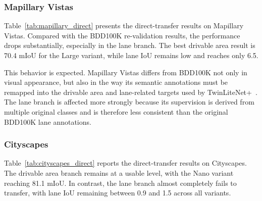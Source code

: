 \documentclass[conference]{IEEEtran}
\begin{document}
\subsubsection{Mapillary Vistas}
Table~\ref{tab:mapillary_direct} presents the direct-transfer results on Mapillary Vistas. Compared with the BDD100K re-validation results, the performance drops substantially, especially in the lane branch. The best drivable area result is 70.4 mIoU for the Large variant, while lane IoU remains low and reaches only 6.5.

\begin{table}[!t]
\centering
\caption{Direct transfer results on Mapillary Vistas.}
\label{tab:mapillary_direct}
\end{table}

This behavior is expected. Mapillary Vistas differs from BDD100K not only in visual appearance, but also in the way its semantic annotations must be remapped into the drivable area and lane-related targets used by TwinLiteNet+~\cite{ref2,ref4}. The lane branch is affected more strongly because its supervision is derived from multiple original classes and is therefore less consistent than the original BDD100K lane annotations.

\subsubsection{Cityscapes}
Table~\ref{tab:cityscapes_direct} reports the direct-transfer results on Cityscapes. The drivable area branch remains at a usable level, with the Nano variant reaching 81.1 mIoU. In contrast, the lane branch almost completely fails to transfer, with lane IoU remaining between 0.9 and 1.5 across all variants.

\begin{table}[!t]
\centering
\caption{Direct transfer results on Cityscapes.}
\label{tab:cityscapes_direct}
\end{table}
\end{document}

